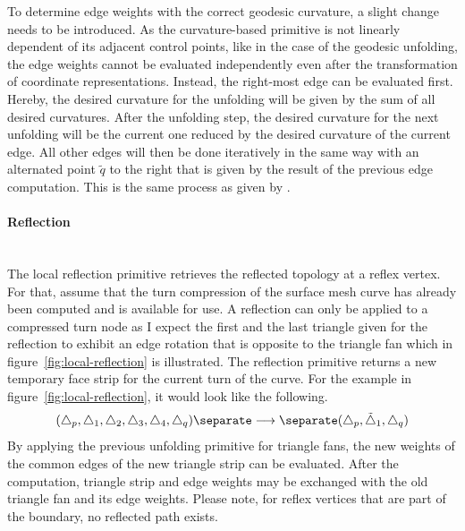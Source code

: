 \documentclass{stdlocal}
\begin{document}
  To determine edge weights with the correct geodesic curvature, a slight change needs to be introduced.
  As the curvature-based primitive is not linearly dependent of its adjacent control points, like in the case of the geodesic unfolding, the edge weights cannot be evaluated independently even after the transformation of coordinate representations.
  Instead, the right-most edge can be evaluated first.
  Hereby, the desired curvature for the unfolding will be given by the sum of all desired curvatures.
  After the unfolding step, the desired curvature for the next unfolding will be the current one reduced by the desired curvature of the current edge.
  All other edges will then be done iteratively in the same way with an alternated point $\tilde{q}$ to the right that is given by the result of the previous edge computation.
  This is the same process as given by \textcite{lawonn2014}.


  \paragraph{Reflection}\hfill\\
  The local reflection primitive retrieves the reflected topology at a reflex vertex.
  For that, assume that the turn compression of the surface mesh curve has already been computed and is available for use.
  A reflection can only be applied to a compressed turn node as I expect the first and the last triangle given for the reflection to exhibit an edge rotation that is opposite to the triangle fan which in figure~\ref{fig:local-reflection} is illustrated.
  The reflection primitive returns a new temporary face strip for the current turn of the curve.
  For the example in figure~\ref{fig:local-reflection}, it would look like the following.
  \[
    (\triangle_p,\triangle_1,\triangle_2,\triangle_3,\triangle_4,\triangle_q)
    \separate
    \longrightarrow
    \separate
    (\triangle_p,\tilde{\triangle}_1,\triangle_q)
  \]
  By applying the previous unfolding primitive for triangle fans, the new weights of the common edges of the new triangle strip can be evaluated.
  After the computation, triangle strip and edge weights may be exchanged with the old triangle fan and its edge weights.
  Please note, for reflex vertices that are part of the boundary, no reflected path exists.
\end{document}
